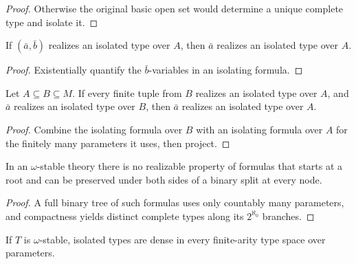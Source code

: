 \begin{proof}
\leanok
Otherwise the original basic open set would determine a unique complete
type and isolate it.
\end{proof}

\begin{lemma}
\label{lem:isolated-projection}
\leanok
{}
If \((\bar a,\bar b)\) realizes an isolated type over \(A\), then
\(\bar a\) realizes an isolated type over \(A\).
\end{lemma}

\begin{proof}
\leanok
Existentially quantify the \(\bar b\)-variables in an isolating formula.
\end{proof}

\begin{lemma}
\label{lem:isolated-transitivity}
\leanok
{}
Let \(A\subseteq B\subseteq M\).  If every finite tuple from \(B\)
realizes an isolated type over \(A\), and \(\bar a\) realizes an isolated
type over \(B\), then \(\bar a\) realizes an isolated type over \(A\).
\end{lemma}

\begin{proof}
\leanok
{}
Combine the isolating formula over \(B\) with an isolating formula over
\(A\) for the finitely many parameters it uses, then project.
\end{proof}

\begin{lemma}
\label{lem:binary-splitting-obstruction}
\leanok
{}
In an \(\omega\)-stable theory there is no realizable property of
formulas that starts at a root and can be preserved under both sides of
a binary split at every node.
\end{lemma}

\begin{proof}
\leanok
A full binary tree of such formulas uses only countably many parameters,
and compactness yields distinct complete types along its
\(2^{\aleph_0}\) branches.
\end{proof}

\begin{theorem}
\label{thm:isolated-types-dense}
\leanok
{}
If \(T\) is \(\omega\)-stable, isolated types are dense in every
finite-arity type space over parameters.
\end{theorem}

